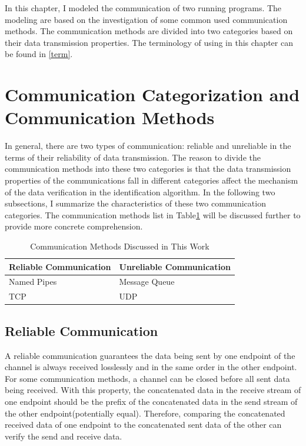 
\label{chapter:Mod}
In this chapter, I modeled the communication of two running programs. The modeling are based on the investigation of some common used communication methods. The communication methods are divided into two categories based on their data transmission properties. The terminology of using in this chapter can be found in \ref{term}.

\section{Communication Categorization and Communication Methods}
In general, there are two types of communication: reliable and unreliable in the terms of their reliability of data transmission. The reason to divide the communication methods into these two categories is that the data transmission properties of the communications fall in different categories affect the mechanism of the data verification in the identification algorithm. In the following two subsections, I summarize the characteristics of these two communication categories. The communication methods list in Table\ref{methodsInCategories} will be discussed further to provide more concrete comprehension. 
\begin{table}[H]
\centering
\caption{Communication Methods Discussed in This Work}
\label{methodsInCategories}
\begin{tabular}{|l|l|}
 \hline
\textbf{Reliable Communication}& \textbf{Unreliable Communication}\\
 \hline
Named Pipes & Message Queue   \\
TCP &  UDP \\
 \hline
\end{tabular}
\end{table}


\subsection{Reliable Communication}\label{reliable}
A reliable communication guarantees the data being sent by one endpoint of the channel is always received losslessly and in the same order in the other endpoint. For some communication methods, a channel can be closed before all sent data being received. With this property, the concatenated data in the receive stream of one endpoint should be the prefix of the concatenated data in the send stream of the other endpoint(potentially equal). Therefore, comparing the concatenated received data of one endpoint to the concatenated sent data of the other can verify the send and receive data.

